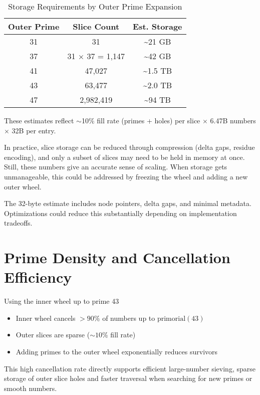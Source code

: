 \begin{table}[H]
\centering
\begin{tabular}{|c|c|c|}
\hline
\textbf{Outer Prime} & \textbf{Slice Count} & \textbf{Est. Storage} \\
\hline
31  & 31                     & \textasciitilde21 GB \\
37  & 31 $\times$ 37 = 1,147 & \textasciitilde42 GB \\
41  & 47,027                 & \textasciitilde1.5 TB \\
43  & 63,477                 & \textasciitilde2.0 TB \\
47  & 2,982,419              & \textasciitilde94 TB \\
\hline
\end{tabular}
\caption{Storage Requirements by Outer Prime Expansion}
\end{table}

These estimates reflect $\sim$10\% fill rate (primes + holes) per slice $\times$ 6.47B numbers $\times$ 32B per entry.

In practice, slice storage can be reduced through compression (delta gaps, residue encoding), and only a subset of slices may need to be held in memory at once. Still, these numbers give an accurate sense of scaling. When storage gets unmanageable, this could be addressed by freezing the wheel and adding a new outer wheel.

The 32-byte estimate includes node pointers, delta gaps, and minimal metadata. Optimizations could reduce this substantially depending on implementation tradeoffs.

\section{Prime Density and Cancellation Efficiency}
Using the inner wheel up to prime 43
\begin{itemize}
  \item Inner wheel cancels \( >90\% \) of numbers up to \( \text{primorial}(43) \)
  \item Outer slices are sparse (\( \sim10\% \) fill rate)
  \item Adding primes to the outer wheel exponentially reduces survivors
\end{itemize}

This high cancellation rate directly supports efficient large-number sieving, sparse storage of outer slice holes and faster traversal when searching for new primes or smooth numbers.

